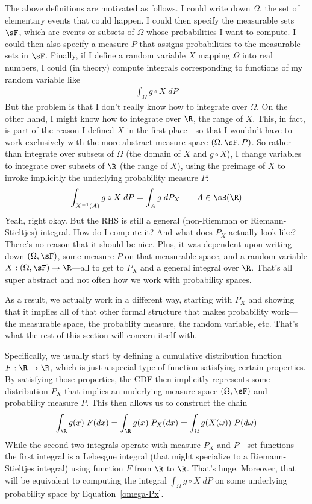 \documentclass[12pt]{article}
\theoremstyle{plain}
\theoremstyle{definition}
\theoremstyle{remark}
\newcommand{\ra}{\rightarrow}
\begin{document}
The above definitions are motivated as follows. I could write down
$\Omega$, the set of elementary events that could happen. I could then
specify the measurable sets $\sF$, which are events or subsets of
$\Omega$ whose probabilities I want to compute. I could then also
specify a measure $P$ that assigns probabilities to the measurable sets
in $\sF$. Finally, if I define a random variable $X$ mapping $\Omega$
into real numbers, I could (in theory) compute integrals corresponding
to functions of my random variable like
\begin{align*}
  \int_\Omega g\circ X \; dP
\end{align*}
But the problem is that I don't really know how to integrate over
$\Omega$. On the other hand, I might know how to integrate over $\R$,
the range of $X$. This, in fact, is part of the reason I defined $X$ in
the first place---so that I wouldn't have to work exclusively with the
more abstract measure space $(\Omega,\sF,P)$. So rather than integrate
over subsets of $\Omega$ (the domain of $X$ and $g\circ X$), I change
variables to integrate over subsets of $\R$ (the range of $X$), using
the preimage of $X$ to invoke implicitly the underlying probability
measure $P$:
\begin{align}
  \int_{X^{-1}(A)} g\circ X \; dP
  =
  \int_A g \; dP_X
  \qquad A \in \sB(\R)
  \label{omega-Px}
\end{align}
Yeah, right okay. But the RHS is still a general (non-Riemman or
Riemann-Stieltjes) integral. How do I compute it? And what does $P_X$
actually look like? There's no reason that it should be nice.
Plus, it was dependent upon writing down $(\Omega,\sF)$, some measure
$P$ on that measurable space, and a random variable
$X:(\Omega,\sF)\ra\R$---all to get to $P_X$ and a general integral over
$\R$.  That's all super abstract and not often how we work with
probability spaces.

As a result, we actually work in a different way, starting with $P_X$
and showing that it implies all of that other formal structure that
makes probability work---the measurable space, the probablity measure,
the random variable, etc. That's what the rest of this section will
concern itself with.

Specifically, we usually start by defining a cumulative distribution
function $F:\R\ra\R$, which is just a special type of function
satisfying certain properties. By satisfying those properties, the CDF
then implicitly represents some distribution $P_X$ that implies an
underlying measure space $(\Omega,\sF)$ and probability measure $P$.
This then allows us to construct the chain
\begin{align*}
  \int_\R g(x) \; F(dx)
  =
  \int_\R g(x) \; P_X(dx)
  =
  \int_\Omega g(X(\omega)) \; P(d\omega)
\end{align*}
While the second two integrals operate with measure $P_X$ and $P$---set
functions---the first integral is a Lebesgue integral (that might
specialize to a Riemann-Stieltjes integral) using function
$F$ from $\R$ to $\R$.  That's huge. Moreover, that will be
equivalent to computing the integral $\int_\Omega g \circ X \; dP$ on
some underlying probability space by Equation~\ref{omega-Px}.
\end{document}
